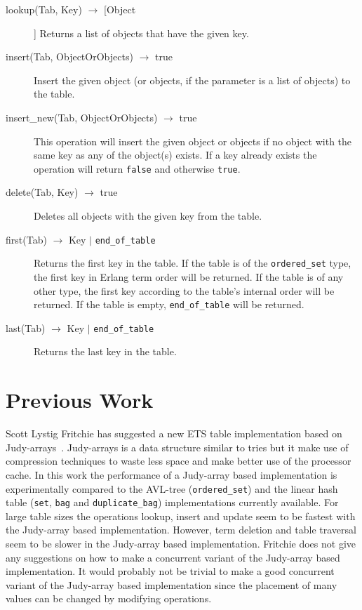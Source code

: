 \documentclass[aps,pre,preprint,nofootinbib]{revtex4}
\begin{document}
\begin{description}
 \item[lookup(Tab, Key) $\rightarrow$ [Object]] 
 Returns a list of objects that have the given key. 
 \item[insert(Tab, ObjectOrObjects) $\rightarrow$ true]
 Insert the given object (or objects, if the parameter is a list of objects) to the table.
 \item[insert\_new(Tab, ObjectOrObjects) $\rightarrow$ true]
 This operation will insert the given object or objects if no object with the same key as any of the object(s) exists. 
 If a key already exists the operation will return \verb|false| and otherwise \verb|true|.
 \item[delete(Tab, Key) $\rightarrow$ true] Deletes all objects with the given key from the table.
 \item[first(Tab) $\rightarrow$ Key $|$ \texttt{end\_of\_table} ] Returns the first key in the table. If the table is of the \verb|ordered_set| type, the first key in Erlang term order will be returned. If the table is of any other type, the first key according to the table's internal order will be returned. If the table is empty, \verb|end_of_table| will be returned.
 \item[last(Tab) $\rightarrow$ Key $|$ \texttt{end\_of\_table} ] Returns the last key in the table.
\end{description}

\section{Previous Work}

  Scott Lystig Fritchie has suggested a new ETS table implementation based on Judy-arrays~\cite{ScottEtsJudy}.
  Judy-arrays is a data structure similar to tries but it make use of compression techniques to waste less space and make better use of the processor cache. 
  In this work the performance of a Judy-array based implementation is experimentally compared to the AVL-tree (\verb|ordered_set|) and the linear hash table (\verb|set|, \verb|bag| and \verb|duplicate_bag|) implementations currently available.
  For large table sizes the operations lookup, insert and update seem to be fastest with the Judy-array based implementation.
  However, term deletion and table traversal seem to be slower in the Judy-array based implementation.
  Fritchie does not give any suggestions on how to make a concurrent variant of the Judy-array based implementation.
  It would probably not be trivial to make a good concurrent variant of the Judy-array based implementation since the placement of many values can be changed by modifying operations.
  
\end{document}
